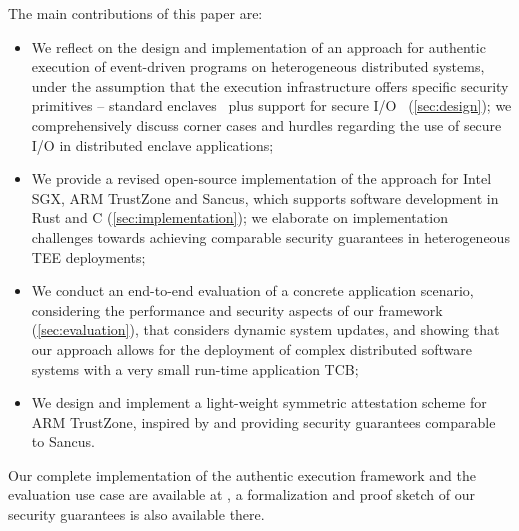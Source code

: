 The main contributions of this paper are:
%
\begin{itemize}
%
  \item We reflect on the design and implementation of an approach for authentic
execution of event-driven programs on heterogeneous distributed systems, under
the assumption that the execution infrastructure offers specific security
primitives -- standard enclaves~\cite{pma} plus support for secure
I/O~\cite{noorman_sancus2} (\cref{sec:design}); we comprehensively discuss
corner cases and hurdles regarding the use of secure I/O in distributed enclave
applications;
%
  \item We provide a revised open-source implementation of the approach for
Intel SGX, ARM TrustZone and Sancus, which supports software development in Rust
and C (\cref{sec:implementation}); we elaborate on implementation challenges
towards achieving comparable security guarantees in heterogeneous TEE
deployments;
%
  \item We conduct an end-to-end evaluation of a concrete application scenario,
considering the performance and security aspects of our framework
(\cref{sec:evaluation}), that considers dynamic system updates, and showing that
our approach allows for the deployment of complex distributed software systems
with a very small run-time application \ac{TCB};
%
  \item We design and implement a light-weight symmetric attestation scheme for
ARM TrustZone, inspired by and providing security guarantees comparable to
Sancus.
%
\end{itemize}

Our complete implementation of the authentic execution framework and the
evaluation use case are available at \implurl{}, a formalization and proof
sketch of our security guarantees is also available there.


